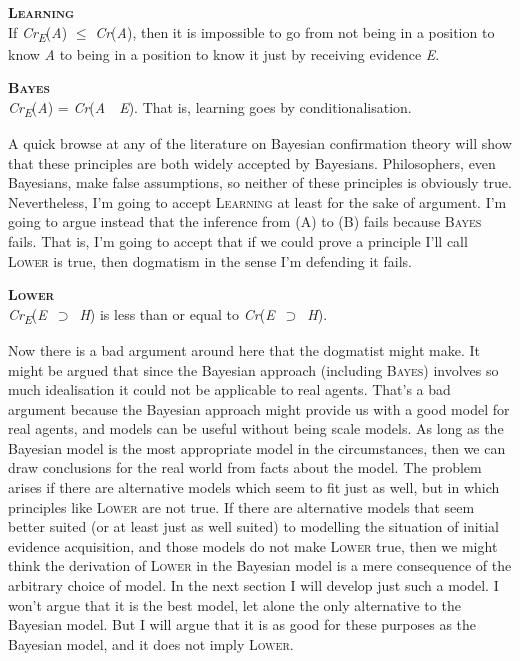 \documentclass[
  11pt,
  letterpaper,
  DIV=11,
  numbers=noendperiod,
  oneside]{scrartcl}
\begin{document}
\textsc{\textbf{Learning}}\\
If \emph{Cr\textsubscript{E}}(\emph{A}) \({\leq}\) \emph{Cr}(\emph{A}),
then it is impossible to go from not being in a position to know
\emph{A} to being in a position to know it just by receiving evidence
\emph{E}.

\textsc{\textbf{Bayes}}\\
\emph{Cr\textsubscript{E}}(\emph{A}) =
\emph{Cr}(\emph{A}~\textbar~\emph{E}). That is, learning goes by
conditionalisation.

A quick browse at any of the literature on Bayesian confirmation theory
will show that these principles are both widely accepted by Bayesians.
Philosophers, even Bayesians, make false assumptions, so neither of
these principles is obviously true. Nevertheless, I'm going to accept
\textsc{Learning} at least for the sake of argument. I'm going to argue
instead that the inference from (A) to (B) fails because \textsc{Bayes}
fails. That is, I'm going to accept that if we could prove a principle
I'll call \textsc{Lower} is true, then dogmatism in the sense I'm
defending it fails.

\textsc{\textbf{Lower}}\\
\emph{Cr\textsubscript{E}}(\emph{E}~\({\supset}\)~\emph{H}) is less than
or equal to \emph{Cr}(\emph{E}~\({\supset}\)~\emph{H}).

Now there is a bad argument around here that the dogmatist might make.
It might be argued that since the Bayesian approach (including
\textsc{Bayes}) involves so much idealisation it could not be applicable
to real agents. That's a bad argument because the Bayesian approach
might provide us with a good model for real agents, and models can be
useful without being scale models. As long as the Bayesian model is the
most appropriate model in the circumstances, then we can draw
conclusions for the real world from facts about the model. The problem
arises if there are alternative models which seem to fit just as well,
but in which principles like \textsc{Lower} are not true. If there are
alternative models that seem better suited (or at least just as well
suited) to modelling the situation of initial evidence acquisition, and
those models do not make \textsc{Lower} true, then we might think the
derivation of \textsc{Lower} in the Bayesian model is a mere consequence
of the arbitrary choice of model. In the next section I will develop
just such a model. I won't argue that it is the best model, let alone
the only alternative to the Bayesian model. But I will argue that it is
as good for these purposes as the Bayesian model, and it does not imply
\textsc{Lower}.
\end{document}
